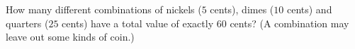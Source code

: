 How many different combinations of nickels ($5$ cents), dimes ($10$ cents) and quarters ($25$ cents) have a total value of exactly $60$ cents? (A combination may leave out some kinds of coin.)
